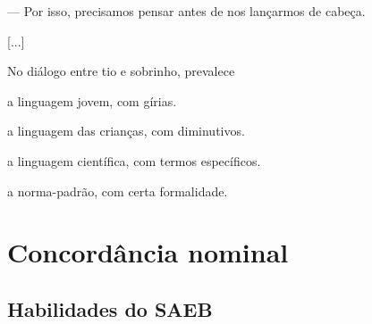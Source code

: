 \begin{conteudo}
\begin{conteudo}
\begin{conteudo}
\begin{conteudo}
\begin{conteudo}
\begin{myquote}
--- Por isso, precisamos pensar antes de nos lançarmos de cabeça.

[...]

\end{myquote}

No diálogo entre tio e sobrinho, prevalece

\begin{escolha}
\item a linguagem jovem, com gírias.

\item a linguagem das crianças, com diminutivos.

\item a linguagem científica, com termos específicos.

\item a norma-padrão, com certa formalidade.
\end{escolha}

\chapter{Concordância nominal}


\section*{Habilidades do SAEB}


\end{conteudo}
\end{conteudo}
\end{conteudo}
\end{conteudo}
\end{conteudo}

